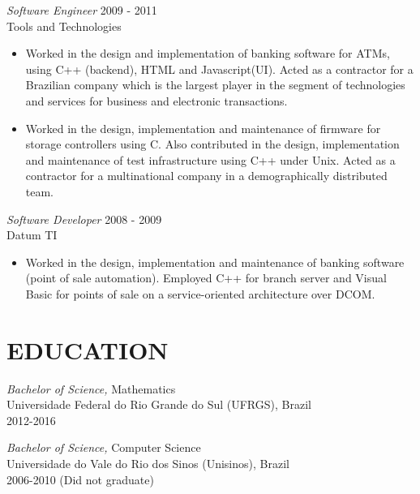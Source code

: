 \documentclass[line,margin]{res}
\begin{document}
\begin{resume}
                {\sl Software Engineer} \hfill            2009 - 2011\\
                Tools and Technologies 
                 \begin{itemize}  \itemsep -2pt %
                 \item Worked in the design and implementation of banking software for ATMs, using C++ (backend),
                       HTML and Javascript(UI). Acted as a contractor for a Brazilian company which is the largest player
                       in the segment of technologies and services for business and electronic transactions.
                 \item Worked in the design, implementation and maintenance of firmware for storage controllers using C. 
                       Also contributed in the design, implementation and maintenance of test infrastructure 
                       using C++ under Unix. Acted as a contractor for a multinational company in a demographically distributed team.
                 \end{itemize} 

                {\sl Software Developer} \hfill        2008 - 2009\\
                Datum TI
                  \begin{itemize}
			  \item Worked in the design, implementation and maintenance of banking software (point of sale automation). 
				  Employed C++ for branch server and Visual Basic for points of sale on a service-oriented architecture over DCOM. 
                   \end{itemize} 

\section{EDUCATION} {\sl Bachelor of Science,} Mathematics \\
                Universidade Federal do Rio Grande do Sul (UFRGS), Brazil \\ 
                2012-2016

                   {\sl Bachelor of Science,} Computer Science \\
                Universidade do Vale do Rio dos Sinos (Unisinos), Brazil \\
                2006-2010 (Did not graduate)


\end{resume}
\end{document}
